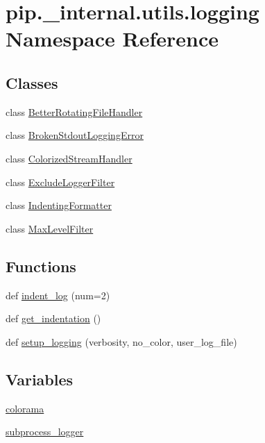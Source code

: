 \hypertarget{namespacepip_1_1__internal_1_1utils_1_1logging}{}\section{pip.\+\_\+internal.\+utils.\+logging Namespace Reference}
\label{namespacepip_1_1__internal_1_1utils_1_1logging}
\subsection*{Classes}
\begin{DoxyCompactItemize}
\item 
class \hyperlink{classpip_1_1__internal_1_1utils_1_1logging_1_1BetterRotatingFileHandler}{Better\+Rotating\+File\+Handler}
\item 
class \hyperlink{classpip_1_1__internal_1_1utils_1_1logging_1_1BrokenStdoutLoggingError}{Broken\+Stdout\+Logging\+Error}
\item 
class \hyperlink{classpip_1_1__internal_1_1utils_1_1logging_1_1ColorizedStreamHandler}{Colorized\+Stream\+Handler}
\item 
class \hyperlink{classpip_1_1__internal_1_1utils_1_1logging_1_1ExcludeLoggerFilter}{Exclude\+Logger\+Filter}
\item 
class \hyperlink{classpip_1_1__internal_1_1utils_1_1logging_1_1IndentingFormatter}{Indenting\+Formatter}
\item 
class \hyperlink{classpip_1_1__internal_1_1utils_1_1logging_1_1MaxLevelFilter}{Max\+Level\+Filter}
\end{DoxyCompactItemize}
\subsection*{Functions}
\begin{DoxyCompactItemize}
\item 
def \hyperlink{namespacepip_1_1__internal_1_1utils_1_1logging_a085a5d65b0702800d0a9d48a0a4615a8}{indent\+\_\+log} (num=2)
\item 
def \hyperlink{namespacepip_1_1__internal_1_1utils_1_1logging_a44d946c100e5712775abb26dc67d1c51}{get\+\_\+indentation} ()
\item 
def \hyperlink{namespacepip_1_1__internal_1_1utils_1_1logging_a679b30d7450aef532c8e303aae7866e1}{setup\+\_\+logging} (verbosity, no\+\_\+color, user\+\_\+log\+\_\+file)
\end{DoxyCompactItemize}
\subsection*{Variables}
\begin{DoxyCompactItemize}
\item 
\hyperlink{namespacepip_1_1__internal_1_1utils_1_1logging_a62d04b07bf9f6eb98b80e144bf0a0360}{colorama}
\item 
\hyperlink{namespacepip_1_1__internal_1_1utils_1_1logging_a32c1d5ed610a13fba36ef4a86f0d8b96}{subprocess\+\_\+logger}
\end{DoxyCompactItemize}


